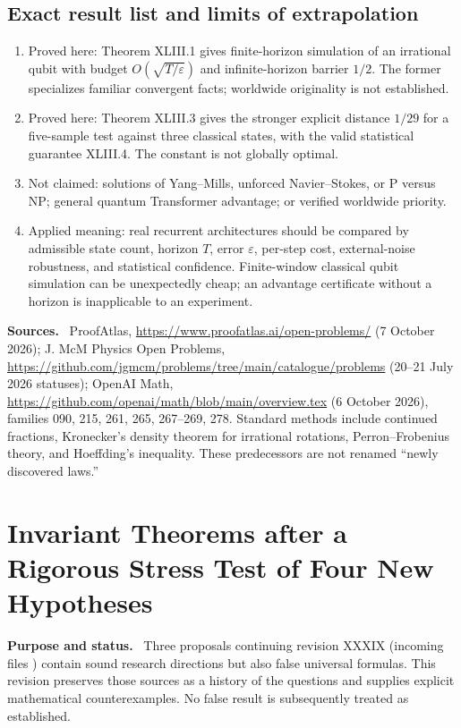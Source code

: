 \documentclass[11pt,a4paper,oneside]{book}
\newcommand{\note}[1]{\par\medskip\noindent\textbf{#1}\ }
\begin{document}
\section{Exact result list and limits of extrapolation}
\begin{enumerate}
\item Proved here: Theorem XLIII.1 gives finite-horizon simulation of an irrational qubit with budget $O(\sqrt{T/\varepsilon})$ and infinite-horizon barrier $1/2$. The former specializes familiar convergent facts; worldwide originality is not established.
\item Proved here: Theorem XLIII.3 gives the stronger explicit distance $1/29$ for a five-sample test against three classical states, with the valid statistical guarantee XLIII.4. The constant is not globally optimal.
\item Not claimed: solutions of Yang--Mills, unforced Navier--Stokes, or P versus NP; general quantum Transformer advantage; or verified worldwide priority.
\item Applied meaning: real recurrent architectures should be compared by admissible state count, horizon $T$, error $\varepsilon$, per-step cost, external-noise robustness, and statistical confidence. Finite-window classical qubit simulation can be unexpectedly cheap; an advantage certificate without a horizon is inapplicable to an experiment.
\end{enumerate}
\note{Sources.} ProofAtlas, \url{https://www.proofatlas.ai/open-problems/} (7 October 2026); J. McM Physics Open Problems, \url{https://github.com/jgmcm/problems/tree/main/catalogue/problems} (20--21 July 2026 statuses); OpenAI Math, \url{https://github.com/openai/math/blob/main/overview.tex} (6 October 2026), families 090, 215, 261, 265, 267--269, 278. Standard methods include continued fractions, Kronecker's density theorem for irrational rotations, Perron--Frobenius theory, and Hoeffding's inequality. These predecessors are not renamed ``newly discovered laws.''
\setcounter{equation}{184}


\chapter{Invariant Theorems after a Rigorous Stress Test of Four New Hypotheses}
\note{Purpose and status.} Three proposals continuing revision XXXIX (incoming files ) contain sound research directions but also false universal formulas. This revision preserves those sources as a history of the questions and supplies explicit mathematical counterexamples. No false result is subsequently treated as established.
\end{document}
